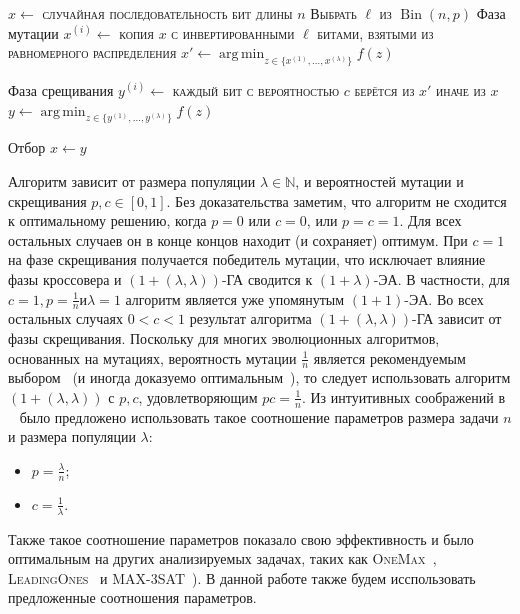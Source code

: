 \documentclass[times]{itmo-student-thesis}
\newcommand{\alglambda}{${(1 + (\lambda , \lambda))}$\xspace}
\newcommand{\alglambdaf}{${(1 + (\lambda , \lambda))}$-ГА\xspace}
\newcommand{\oea}{\mbox{$(1 + 1)$-ЭА}\xspace}
\newcommand{\oplea}{\mbox{$(1+\lambda)$-ЭА}\xspace}
\newcommand{\onemax}{\textsc{OneMax}\xspace}
\newcommand{\leadingones}{\textsc{LeadingOnes}\xspace}
\newcommand{\N}{{\mathbb N}}
\DeclareMathOperator{\Bin}{Bin}
\DeclareMathOperator*{\argmin}{arg\,min}
\begin{document}
\begin{algorithm}[h]
\caption{Псевдокод \alglambdaf, минимизирующего $f$}\label{ollgaMin}
\begin{algorithmic}
	\State$x \gets $ \textsc{случайная последовательность бит длины} $n$
		\State \textsc{Выбрать} $\ell$ \textsc{из} $\Bin\left(n, p\right)$ \Comment Фаза мутации
         		\State$x^{(i)} \gets$ \textsc{копия} $x$ \textsc{с инвертированными} $\ell$ \textsc{битами, взятыми из равномерного распределения}
         	\EndFor
	     	\State $x' \gets \argmin_{z \in \{x^{(1)}, \dots, x^{(\lambda)}\}}f(z)$

		 \Comment Фаза срещивания
	          	\State $y^{(i)} \gets$ \textsc{каждый бит с вероятностью $c$ берётся из $x'$ иначе из $x$}
		\EndFor
	      	\State $y \gets \argmin_{z \in \{y^{(1)}, \dots, y^{(\lambda)}\} }f(z)$

		 \Comment Отбор
			\State $x \gets y$
		\EndIf
	\EndFor
\end{algorithmic}
\end{algorithm}

Алгоритм зависит от размера популяции $\lambda \in \N$, и вероятностей мутации и скрещивания $p, c \in [0, 1]$.
Без доказательства заметим, что алгоритм не сходится к оптимальному решению, когда $p = 0$ или $c = 0$, или $p = c = 1$.
Для всех остальных случаев он в конце концов находит (и сохраняет) оптимум.
При $c = 1$ на фазе скрещивания получается победитель мутации, что исключает влияние фазы кроссовера и \alglambdaf сводится к \oplea.
В частности, для $c = 1, p = \frac{1}{n} и \lambda = 1$ алгоритм является уже упомянутым \oea.
Во всех остальных случаях $0 < c < 1$ результат алгоритма \alglambdaf зависит от фазы скрещивания.
Поскольку для многих эволюционных алгоритмов, основанных на мутациях, вероятность мутации $\frac{1}{n}$ является рекомендуемым выбором~\cite{ссылка} (и иногда доказуемо оптимальным~\cite{ссылка}), то следует использовать алгоритм \alglambda с $p, c$, удовлетворяющим $pc = \frac{1}{n}$.
Из интуитивных соображений в ~\cite{ссылка} было предложено использовать такое соотношение параметров размера задачи $n$ и размера популяции $\lambda$:
\begin{itemize}
 \item $p = \frac{\lambda}{n}$;
 \item $c = \frac{1}{\lambda}$.
 \end{itemize}
Также такое соотношение параметров показало свою эффективность и было оптимальным на других анализируемых задачах, таких как \onemax~\cite{ссылка}, \leadingones~\cite{ссылка} и MAX-3SAT~\cite{ссылка}). В данной работе также будем исспользовать предложенные соотношения параметров.
\end{document}

